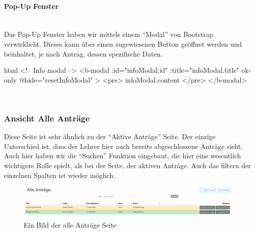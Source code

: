 \paragraph{Pop-Up Fenster}
~\\
Das Pop-Up Fenster haben wir mittels einem \enquote{Modal} von Bootstrap verwirklicht. Dieses kann über einen zugewiesenen Button geöffnet werden und beinhaltet, je nach Antrag, dessen spezifische Daten.
\begin{code}{html}
	<!-- Info modal -->
    <b-modal
      :id="infoModal.id"
      :title="infoModal.title"
      ok-only
      @hide="resetInfoModal"
    >
      <pre>{{ infoModal.content }}</pre>
    </b-modal>
\end{code}
	\label{list:codepopup} ~\\

\subsubsection{Ansicht Alle Anträge}
Diese Seite ist sehr ähnlich zu der \enquote{Aktive Anträge} Seite. Der einzige Unterschied ist, dass der Lehrer hier auch bereits abgeschlossene Anträge sieht. Auch hier haben wir die \enquote{Suchen} Funktion eingebaut, die hier eine wesentlich wichtigere Rolle spielt, als bei der Seite, der aktiven Anträge. Auch das filtern der einzelnen Spalten ist wieder möglich.
\begin{figure}[H]
	\centering
	\includegraphics[width=1\linewidth]{images/website/alle}
	\caption[Aktiv]{Ein Bild der alle Anträge Seite}
	\label{fig:antragalle}
\end{figure}
~\\

\newpage
